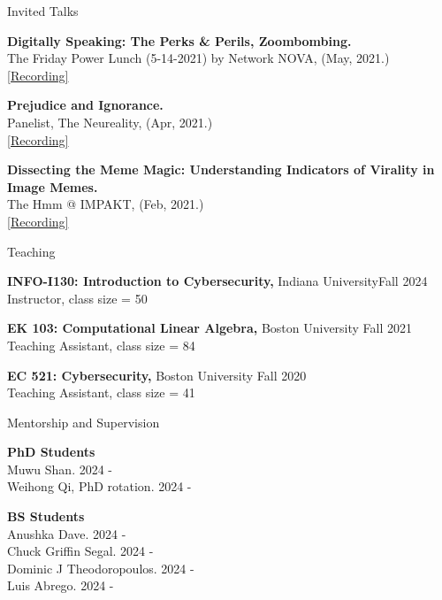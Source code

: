 \documentclass[12pt]{resume}
\begin{document}
\begin{rSection}{Invited Talks}
\item 
\textbf{Digitally Speaking: The Perks \& Perils, Zoombombing.}\\
 The Friday Power Lunch (5-14-2021) by Network NOVA, (May, 2021.)\\
\href{https://www.youtube.com/watch?v=JB6-rnlVD6g&t=8s}{[Recording]} 
\item 
\textbf{Prejudice and Ignorance.}\\
Panelist, The Neureality, (Apr, 2021.)\\
\href{https://www.bilibili.com/video/BV1py4y1b7d8/}
{[Recording]} 
\item 
\textbf{Dissecting the Meme Magic: Understanding Indicators of Virality in Image Memes.}\\
The Hmm @ IMPAKT, (Feb, 2021.)\\
\href{https://impakt.nl/events/2021/conversation/the-hmm-impakt/}{[Recording]}
\end{rSection}

\medskip

\begin{rSection}{Teaching}
\item \textbf{INFO-I130: Introduction to Cybersecurity, }Indiana University\hfill Fall 2024
\\Instructor, class size = 50
\item \textbf{EK 103: Computational Linear Algebra, }Boston University \hfill Fall 2021
\\Teaching Assistant, class size = 84
\item \textbf{EC 521: Cybersecurity, }Boston University \hfill Fall 2020
\\Teaching Assistant, class size = 41
\end{rSection}

\medskip


\begin{rSection}{Mentorship and Supervision}
\item \textbf{PhD Students}\\
Muwu Shan.
\hfill 2024 -\\
Weihong Qi, PhD rotation. 
\hfill 2024 -
\item \textbf{BS Students}\\
Anushka Dave.
\hfill 2024 -\\
Chuck Griffin Segal.
\hfill 2024 -\\
Dominic J Theodoropoulos.
\hfill 2024 -\\
Luis Abrego.
\hfill 2024 -\\

\end{rSection}
\end{document}

